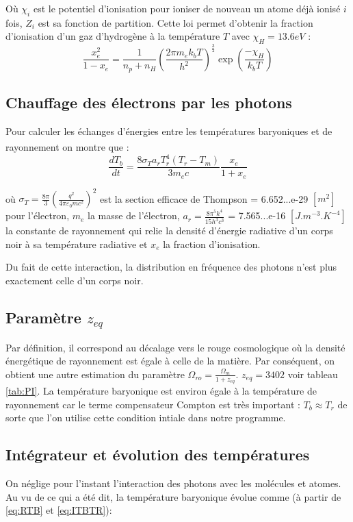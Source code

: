 \documentclass[10pt, a4paper]{report}
\numberwithin{equation}{subsection}
\begin{document}
Où $\chi_i$ est le potentiel d'ionisation pour ioniser de nouveau un atome déjà ionisé $i$ fois, $Z_i$ est sa fonction de partition. Cette loi permet d'obtenir la fraction d'ionisation d'un gaz d'hydrogène à la température $T$ avec $\chi_H=13.6 eV$ :
\begin{equation} \label{eq:XE}
\boxed{\frac{x_e^2}{1-x_e} = \frac{1}{n_p+n_H} \left( \frac{2\pi m_ek_bT}{h^2}\right)^{\frac{3}{2}} \exp(\frac{-\chi_H}{k_bT})}
\end{equation}

\subsection{Chauffage des électrons par les photons}

Pour calculer les échanges d'énergies entre les températures baryoniques et de rayonnement on montre que \textsuperscript{\cite{PEEBLESBOOK}} : 
\begin{equation} \label{eq:ITBTR}
\boxed{\frac{dT_b}{dt} = \frac{8\sigma_Ta_rT_r^4(T_r-T_m)}{3m_ec}\frac{x_e}{1+x_e}}
\end{equation}

 où $\sigma_T = \frac{8\pi} 3 \left(\frac{q^2}{4\pi\varepsilon_0mc^2}\right)^2$ est la section efficace de Thompson = 6.652...e-29 $[m^2]$ pour l'électron, $m_e$ la masse de l'électron, $a_r = \frac{8 \pi^5 k^4}{15 h^3 c^3}$ = 7.565...e-16 $[J.m^{-3}.K^{-4}]$ la constante de rayonnement qui relie la densité d'énergie radiative d'un corps noir à sa température radiative et $x_e$ la fraction d'ionisation.

Du fait de cette interaction, la distribution en fréquence des photons n'est plus exactement celle d'un corps noir.   

\subsection{Paramètre $z_{eq}$}
Par définition, il correspond au décalage vers le rouge cosmologique où la densité énergétique de rayonnement est égale à celle de la matière. Par conséquent, on obtient une autre estimation du paramètre $\Omega_{ro} = \frac{\Omega_{m}}{1+z_{eq}}$. $z_{eq} = 3402$ voir tableau \ref{tab:PI}. La température baryonique est environ égale à la température de rayonnement car le terme compensateur Compton est très important : $T_b \approx T_r$ de sorte que l'on utilise cette condition intiale dans notre programme.

\subsection{Intégrateur et évolution des températures}\label{IEEDT}
On néglige pour l'instant l'interaction des photons avec les molécules et atomes. Au vu de ce qui a été dit, la température baryonique évolue comme (à partir de \ref{eq:RTB} et \ref{eq:ITBTR}):
\end{document}

